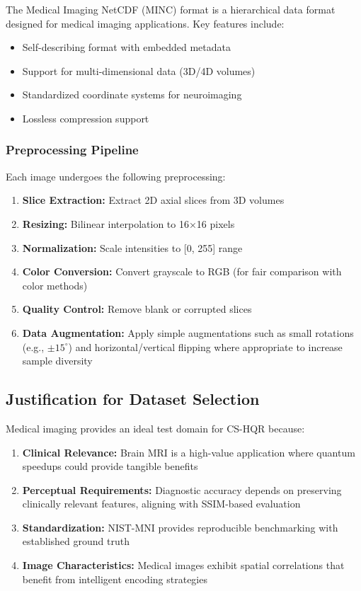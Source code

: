 \documentclass[11pt,a4paper]{article}
\begin{document}
The Medical Imaging NetCDF (MINC) format is a hierarchical data format designed for medical imaging applications. Key features include:

\begin{itemize}
    \item Self-describing format with embedded metadata
    \item Support for multi-dimensional data (3D/4D volumes)
    \item Standardized coordinate systems for neuroimaging
    \item Lossless compression support
\end{itemize}

\subsubsection{Preprocessing Pipeline}

Each image undergoes the following preprocessing:

\begin{enumerate}
    \item \textbf{Slice Extraction:} Extract 2D axial slices from 3D volumes
    \item \textbf{Resizing:} Bilinear interpolation to 16×16 pixels
    \item \textbf{Normalization:} Scale intensities to [0, 255] range
    \item \textbf{Color Conversion:} Convert grayscale to RGB (for fair comparison with color methods)
    \item \textbf{Quality Control:} Remove blank or corrupted slices
    \item \textbf{Data Augmentation:} Apply simple augmentations such as small rotations (e.g., $\pm 15^\circ$) and horizontal/vertical flipping where appropriate to increase sample diversity
\end{enumerate}

\subsection{Justification for Dataset Selection}

Medical imaging provides an ideal test domain for CS-HQR because:

\begin{enumerate}
    \item \textbf{Clinical Relevance:} Brain MRI is a high-value application where quantum speedups could provide tangible benefits
    \item \textbf{Perceptual Requirements:} Diagnostic accuracy depends on preserving clinically relevant features, aligning with SSIM-based evaluation
    \item \textbf{Standardization:} NIST-MNI provides reproducible benchmarking with established ground truth
    \item \textbf{Image Characteristics:} Medical images exhibit spatial correlations that benefit from intelligent encoding strategies
\end{enumerate}
\end{document}

